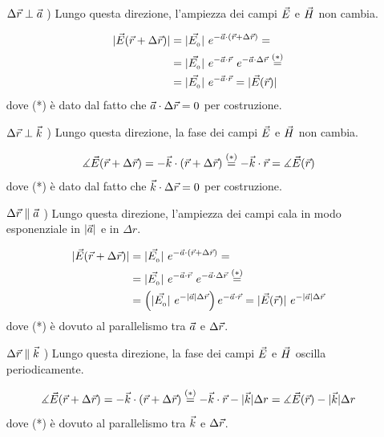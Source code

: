 	\begin{itemize}
		\item[$\Delta\vec{r} \perp \vec{a}$ )] Lungo questa direzione, l'ampiezza dei campi $\vec{E}$ e $\vec{H}$ non cambia.

		\begin{equation*}
			\begin{split}
				|\vec{E}(\vec{r} + \Delta\vec{r})| &= |\vec{E_{_{0}}}| ~ e^{-\vec{a} \cdot (\vec{r} + \Delta\vec{r})} = \\
				& = |\vec{E_{_{0}}}| ~ e^{-\vec{a} \cdot \vec{r}} ~ e^{-\vec{a} \cdot \Delta\vec{r}} \stackrel{(*)}{=} \\
				& = |\vec{E_{_{0}}}| ~ e^{-\vec{a} \cdot \vec{r}} = |\vec{E}(\vec{r})|
			\end{split}
		\end{equation*}
		dove (*) è dato dal fatto che $\vec{a} \cdot \Delta\vec{r} = 0$ per costruzione.

		\item[$\Delta\vec{r} \perp \vec{k}$ )] Lungo questa direzione, la fase dei campi $\vec{E}$ e $\vec{H}$ non cambia.

		\begin{equation*}
				\measuredangle \vec{E}(\vec{r} + \Delta\vec{r}) = -\vec{k} \cdot (\vec{r} + \Delta\vec{r}) \stackrel{(*)}{=} - \vec{k} \cdot \vec{r} = \measuredangle \vec{E}(\vec{r})
		\end{equation*}
		dove (*) è dato dal fatto che $\vec{k} \cdot \Delta\vec{r} = 0$ per costruzione.

		\item[$\Delta\vec{r} \parallel \vec{a}$ )] Lungo questa direzione, l'ampiezza dei campi cala in modo esponenziale in $|\vec{a}|$ e in $\Delta r$.

		\begin{equation*}
			\begin{split}
				|\vec{E}(\vec{r} + \Delta\vec{r})| &= |\vec{E_{_{0}}}| ~ e^{-\vec{a} \cdot (\vec{r} + \Delta\vec{r})} = \\
				& = |\vec{E_{_{0}}}| ~ e^{-\vec{a} \cdot \vec{r}} ~ e^{-\vec{a} \cdot \Delta\vec{r}} \stackrel{(*)}{=} \\
				& = \left( |\vec{E_{_{0}}}| ~ e^{-|\vec{a}| \Delta\vec{r}} \right) e^{-\vec{a} \cdot \vec{r}} = |\vec{E}(\vec{r})| ~ e^{-|\vec{a}| \Delta\vec{r}}
			\end{split}
		\end{equation*}
		dove (*) è dovuto al parallelismo tra $\vec{a}$ e $\Delta\vec{r}$.

		\item[$\Delta\vec{r} \parallel \vec{k}$ )] Lungo questa direzione, la fase dei campi $\vec{E}$ e $\vec{H}$ oscilla periodicamente.

		\begin{equation*}
				\measuredangle \vec{E}(\vec{r} + \Delta\vec{r}) = -\vec{k} \cdot (\vec{r} + \Delta\vec{r}) \stackrel{(*)}{=} - \vec{k} \cdot \vec{r} - |\vec{k}| \Delta r = \measuredangle \vec{E}(\vec{r}) - |\vec{k}| \Delta r
		\end{equation*}
		dove (*) è dovuto al parallelismo tra $\vec{k}$ e $\Delta\vec{r}$.


\end{itemize}
